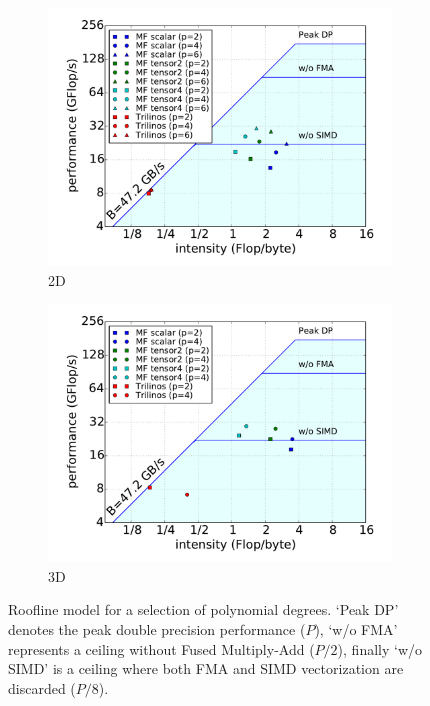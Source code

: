 \documentclass[times,doublespace]{nmeauth}
\begin{document}
\begin{figure}[!ht]
  \centering
  \begin{subfigure}[b]{0.49\textwidth}
    \centering
    \includegraphics[width=\textwidth]{LIKWID_Emmy_RRZE_roofline_2d.pdf}
    \caption{2D}
    \label{fig:roofline_2d}
  \end{subfigure}
  \begin{subfigure}[b]{0.49\textwidth}
    \centering
    \includegraphics[width=\textwidth]{LIKWID_Emmy_RRZE_roofline_3d.pdf}
    \caption{3D}
    \label{fig:roofline_3d}
  \end{subfigure}
  \caption{Roofline model for a selection of polynomial degrees. `Peak DP' denotes the peak double precision performance ($P$),
  `w/o FMA' represents a ceiling without Fused Multiply-Add ($P/2$), finally `w/o SIMD' is a ceiling where both FMA
    and SIMD vectorization are discarded ($P/8$).}%
  \label{fig:roofline}
\end{figure}
\end{document}

